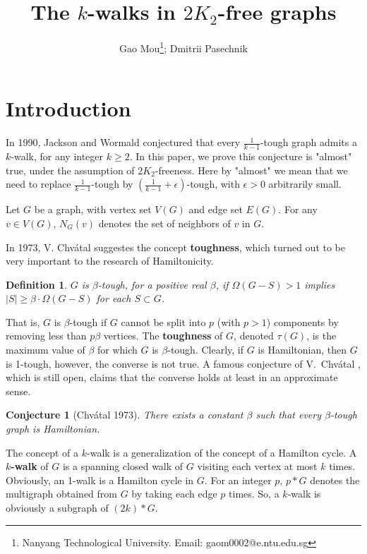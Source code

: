 \documentclass[12pt]{article}
\author{Gao Mou\thanks{Nanyang Technological University. Email: gaom0002@e.ntu.edu.sg}; Dmitrii Pasechnik}
\title{The $k$-walks in $2K_2$-free graphs}
\newtheorem{conjecture}{Conjecture}
\newtheorem{definition}{Definition}
\begin{document}
\maketitle


\section{Introduction}
In 1990, Jackson and Wormald conjectured \cite{jackson1990k} that every $\frac{1}{k-1}$-tough graph admits a $k$-walk, for any integer $k\ge2$. In this paper, we prove this conjecture is "almost" true, under the assumption of $2K_2$-freeness. Here by "almost" we mean that we need to replace $\frac{1}{k-1}$-tough by $(\frac{1}{k-1}+\epsilon)$-tough, with $\epsilon>0$ arbitrarily small.

Let $G$ be a graph, with vertex set $V(G)$ and edge set $E(G)$. For any $v\in V(G)$, $N_G(v)$ denotes the set of neighbors of $v$ in $G$. 

In 1973, V. Chv\'{a}tal suggestes the concept {\bf toughness}, which turned out to be very important to the research of Hamiltonicity.
\begin{definition}
$G$ is $\beta$-{\em tough},
for a positive real $\beta$, if $\Omega(G-S)>1$ implies $|S|\ge \beta\cdot \Omega(G-S)$ 
for each $S\subset G$.
\end{definition}

That is, $G$ is $\beta$-tough if
$G$ cannot be split into $p$ (with $p>1$) components by removing less than
$p\beta$ vertices.  The {\bf toughness} of $G$, denoted $\tau(G)$, is the maximum
value of $\beta$ for which $G$ is $\beta$-tough.  Clearly, if $G$ is
Hamiltonian, then $G$ is 1-tough, however, the converse is not true.  A famous
conjecture of V.~Chv\'{a}tal \cite{chvatal1973tough}, which is still open, claims
that the converse holds at least in an approximate sense.
\begin{conjecture}[Chv\'{a}tal 1973]\label{conj1} There exists a constant $\beta$ such that every
$\beta$-tough graph is Hamiltonian.  \end{conjecture}

The concept of a $k$-walk is a generalization of the concept of a Hamilton cycle.
A {\bf $k$-walk} of $G$ is a spanning closed walk of $G$ visiting each vertex at most $k$ times.  Obviously, an 1-walk is a Hamilton cycle in $G$.
For an integer $p$, $p*G$ denotes the multigraph obtained from $G$ by taking each edge $p$ times. So, a $k$-walk is obviously a subgraph of $(2k)*G$. 
\end{document}
